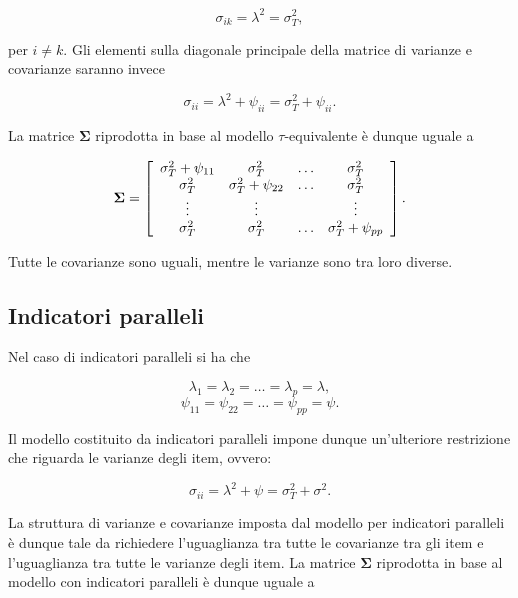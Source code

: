 \documentclass[
  11pt,
]{krantz}
\theoremstyle{definition}
\theoremstyle{definition}
\theoremstyle{definition}
\theoremstyle{definition}
\theoremstyle{remark}
\begin{document}
\begin{equation}
\sigma_{ik} = \lambda^2=\sigma^2_T,
\label{eq:cov-tau-eq}
\end{equation}

per \(i\neq k\). Gli elementi sulla diagonale principale della matrice di varianze e covarianze saranno invece

\begin{equation}
\sigma_{ii} = \lambda^2 + \psi_{ii} =\sigma^2_T + \psi_{ii}.
\label{eq:var-tau}
\end{equation}

La matrice \(\boldsymbol{\Sigma}\) riprodotta in base al modello \(\tau\)-equivalente è dunque uguale a

\begin{equation}
\boldsymbol{\Sigma}=\left[
      \begin{array}{ c c c c }
        \sigma_{T}^2 + \psi_{11} & \sigma_{T}^2 & \dots & \sigma_{T}^2 \\
        \sigma_{T}^2 & \sigma_{T}^2 + \psi_{22} & \dots & \sigma_{T}^2 \\
        \vdots & \vdots & & \vdots\\
        \sigma_{T}^2 & \sigma_{T}^2 & \dots & \sigma_{T}^2 + \psi_{pp} 
      \end{array} 
    \right].
\label{eq:sigma-tau-eq}
\end{equation}

Tutte le covarianze sono uguali, mentre le varianze sono tra loro diverse.

\hypertarget{indicatori-paralleli}{%
\subsection{Indicatori paralleli}\label{indicatori-paralleli}}

Nel caso di indicatori paralleli si ha che

\[
\lambda_1=\lambda_2=\dots=\lambda_p=\lambda,
\] \[
\psi_{11}=\psi_{22}=\dots=\psi_{pp}=\psi.
\]

Il modello costituito da indicatori paralleli impone dunque un'ulteriore restrizione che riguarda le varianze degli item, ovvero:

\[
\sigma_{ii} = \lambda^2 + \psi =\sigma^2_T + \sigma^2.
\]

La struttura di varianze e covarianze imposta dal modello per indicatori paralleli è dunque tale da richiedere l'uguaglianza tra tutte le covarianze tra gli item e l'uguaglianza tra tutte le varianze degli item. La matrice \(\boldsymbol{\Sigma}\) riprodotta in base al modello con indicatori paralleli è dunque uguale a
\end{document}
